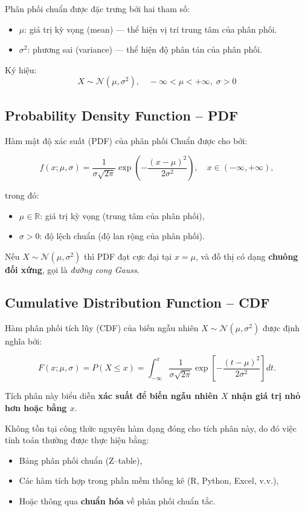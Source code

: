 Phân phối chuẩn được đặc trưng bởi hai tham số:
\begin{itemize}
    \item $\mu$: giá trị kỳ vọng (mean) — thể hiện vị trí trung tâm của phân phối.
    \item $\sigma^2$: phương sai (variance) — thể hiện độ phân tán của phân phối.
\end{itemize}
Ký hiệu:
\[
X \sim \mathcal{N}(\mu,\sigma^2), \quad -\infty < \mu < +\infty, \; \sigma > 0
\]


\subsection{Probability Density Function – PDF}

Hàm mật độ xác suất (PDF) của phân phối Chuẩn được cho bởi:

\[
f(x;\mu,\sigma) = \frac{1}{\sigma\sqrt{2\pi}}
\exp\left(-\frac{(x-\mu)^2}{2\sigma^2}\right), \quad x \in (-\infty, +\infty),
\]

trong đó:
\begin{itemize}
    \item \(\mu \in \mathbb{R}\): giá trị kỳ vọng (trung tâm của phân phối),
    \item \(\sigma > 0\): độ lệch chuẩn (độ lan rộng của phân phối).
\end{itemize}

Nếu \( X \sim \mathcal{N}(\mu,\sigma^2) \) thì PDF đạt cực đại tại \( x = \mu \), và đồ thị có dạng \textbf{chuông đối xứng}, gọi là \textit{đường cong Gauss}.


\subsection{Cumulative Distribution Function – CDF}

Hàm phân phối tích lũy (CDF) của biến ngẫu nhiên \( X \sim \mathcal{N}(\mu,\sigma^2) \) được định nghĩa bởi:

\[
F(x;\mu,\sigma) = P(X \le x) 
= \int_{-\infty}^x \frac{1}{\sigma\sqrt{2\pi}}
\exp\left[-\frac{(t-\mu)^2}{2\sigma^2}\right] dt.
\]

Tích phân này biểu diễn \textbf{xác suất để biến ngẫu nhiên \(X\) nhận giá trị nhỏ hơn hoặc bằng \(x\)}.

Không tồn tại công thức nguyên hàm dạng đóng cho tích phân này, do đó việc tính toán thường được thực hiện bằng:
\begin{itemize}
    \item Bảng phân phối chuẩn (Z–table),
    \item Các hàm tích hợp trong phần mềm thống kê (R, Python, Excel, v.v.),
    \item Hoặc thông qua \textbf{chuẩn hóa} về phân phối chuẩn tắc.
\end{itemize}

